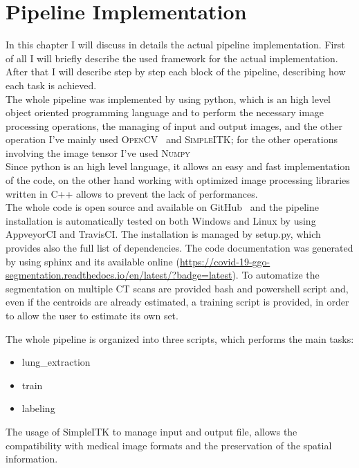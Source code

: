 
	
	\section{Pipeline Implementation}
	
	
	In this chapter I will discuss in details the actual pipeline implementation. First of all I will briefly describe the used framework for the actual implementation. After that I will describe step by step each block of the pipeline, describing how each task is achieved.\\
	
	The whole pipeline was implemented by using python, which is an high level object oriented programming language and to perform the necessary image processing operations, the managing of input and output images, and the other operation I've mainly used \textsc{OpenCV}~\cite{OpenCV} and \textsc{SimpleITK}; for the other operations involving the image tensor I've used \textsc{Numpy}~\cite{Numpy}\\
	Since python is an high level language, it allows an easy and fast implementation of the code, on the other hand working with optimized image processing libraries written in C++ allows to prevent the lack of performances.\\
	
	The whole code is open source and available on GitHub~\cite{REP:CTLungSeg} and the pipeline installation is automatically tested on both Windows and Linux by using AppveyorCI and TravisCI.  The installation is managed by setup.py, which provides also the full list of dependencies. The code documentation was generated by using sphinx and its available online (\url{https://covid-19-ggo-segmentation.readthedocs.io/en/latest/?badge=latest}). To automatize the segmentation on multiple CT scans are provided bash and powershell script and,  even if the centroids are already estimated, a training script is provided, in order to allow the user to estimate its own set.
	
	The whole pipeline is organized into three scripts, which performs the main tasks: 
	\begin{itemize}
		\item lung\_extraction
		\item train
		\item labeling
	\end{itemize}
	
	The usage of SimpleITK to manage input and output file, allows the compatibility with medical image formats and the preservation of the spatial information.
 
